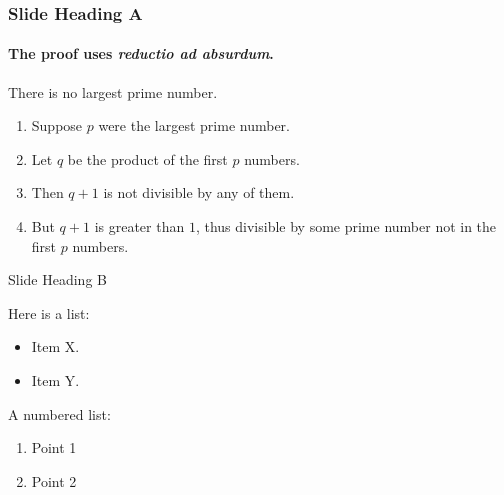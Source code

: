 \documentclass{beamer}
\begin{document}
\begin{frame} 
\frametitle{Slide Heading A} 
\framesubtitle{The proof uses \textit{reductio ad absurdum}.} 

\begin{theorem}
There is no largest prime number. \end{theorem} 
\begin{enumerate} 
\item<1-| alert@1> Suppose $p$ were the largest prime number. 
\item<2-> Let $q$ be the product of the first $p$ numbers. 
\item<3-> Then $q+1$ is not divisible by any of them. 
\item<1-> But $q + 1$ is greater than $1$, thus divisible by some prime
number not in the first $p$ numbers.
\end{enumerate}

\end{frame}


\begin{frame}{Slide Heading B}

Here is a list:
\begin{itemize}
\item Item X.
\item Item Y.
\end{itemize}

A numbered list:
\begin{enumerate}
\item Point 1
\item Point 2
\end{enumerate}

\end{frame}

\end{document}
